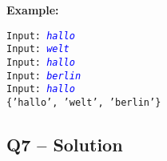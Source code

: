\documentclass[a4paper,11pt]{article}
\begin{document}
\textbf{Example:}
\begin{flushleft}
	\texttt{Input: \textcolor{blue}{\textit{hallo}}}\\
	\texttt{Input: \textcolor{blue}{\textit{welt}}}\\
	\texttt{Input: \textcolor{blue}{\textit{hallo}}}\\
	\texttt{Input: \textcolor{blue}{\textit{berlin}}}\\
	\texttt{Input: \textcolor{blue}{\textit{hallo}}}\\
	\texttt{\{'hallo', 'welt', 'berlin'\}}
\end{flushleft}

\subsection*{Q7 – Solution}
\inputminted{python}{Files/11/7.py}



	
	
\end{document}
